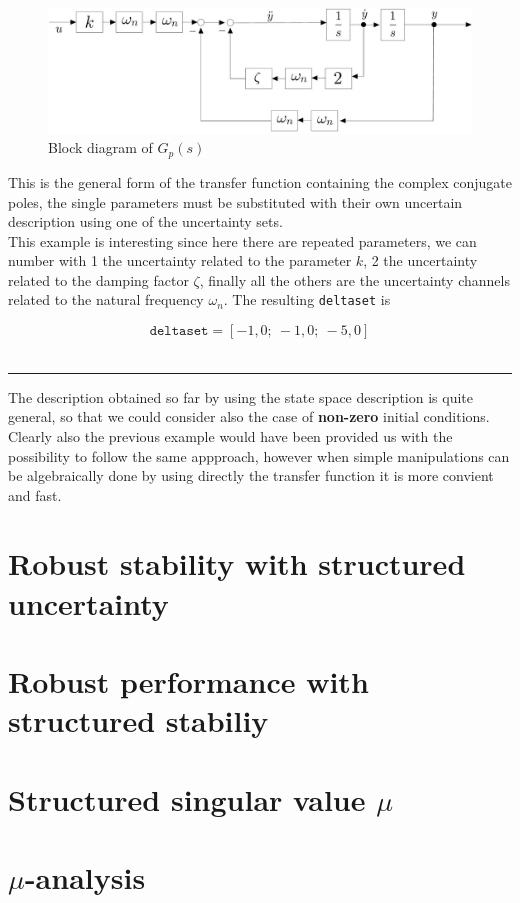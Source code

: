 \documentclass[a4paper, 12pt]{article}
\begin{document}
\begin{figure}[h]
    \centering
    \includegraphics[scale=0.3]{img/complex.jpg}
    \caption{Block diagram of $G_p(s)$}
\end{figure}
\newpage
\noindent
This is the general form of the transfer function containing the complex conjugate poles, the single parameters must be substituted with their own uncertain description using one of the uncertainty sets.\\
 This example is interesting since here there are repeated parameters, we can number with 1 the uncertainty related to the parameter $k$, 2 the uncertainty related to the damping factor $\zeta$, finally all the others are the uncertainty channels related to the natural frequency $\omega_n$. The resulting \texttt{deltaset} is
 
 \begin{equation}
    \texttt{deltaset}=[
        -1,0; \
        -1,0; \
        -5,0
    ]
 \end{equation}\\

\hrule
\vspace{0.3em}
\noindent
\textsf{The description obtained so far by using the state space description is quite general, so that we could consider also the case of \textbf{non-zero} initial conditions. Clearly also the previous example would have been provided us with the possibility to follow the same appproach, however when simple manipulations can be algebraically done by using directly the transfer function it is more convient and fast.}

\section{Robust stability with structured uncertainty}

\section{Robust performance with structured stabiliy}

\section{Structured singular value $\mu$}

\section{$\mu$-analysis}
\end{document}
